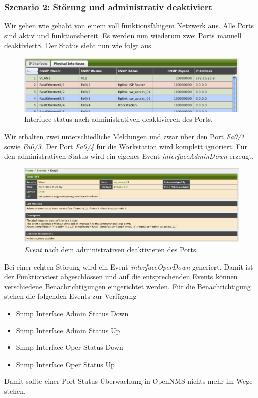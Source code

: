 \subsubsection{Szenario 2: Störung und administrativ deaktiviert}
Wir gehen wie gehabt von einem voll funktionsfähigem Netzwerk aus. Alle Ports sind aktiv und funktionsbereit. Es werden nun wiederum zwei Ports manuell deaktiviert8. Der Status sieht nun wie folgt aus.
\begin{figure}[H]
	\centering
	\includegraphics[width=1.0\textwidth]{images/use-cases/monitoring-layer-2/port-admin-down}
	\caption{Interface status nach administrativen deaktivieren des Ports.}
	\label{pic:port-admin-down}
\end{figure}
Wir erhalten zwei unterschiedliche Meldungen und zwar über den Port \emph{Fa0/1} sowie \emph{Fa0/3}. Der Port \emph{Fa0/4} für die Workstation wird komplett ignoriert. Für den administrativen Status wird ein eigenes Event \emph{interfaceAdminDown} erzeugt.
\begin{figure}[H]
	\centering
	\includegraphics[width=1.0\textwidth]{images/use-cases/monitoring-layer-2/port-admin-down-event}
	\caption{\emph{Event} nach dem administrativen deaktivieren des Ports.}
	\label{pic:port-admin-down-event}
\end{figure}
Bei einer echten Störung wird ein Event \emph{interfaceOperDown} generiert. Damit ist der Funktionstest abgeschlossen und auf die entsprechenden Events können verschiedene Benachrichtigungen eingerichtet werden. Für die Benachrichtigung stehen die folgenden Events zur Verfügung
\begin{itemize}
  \item{Snmp Interface Admin Status Down}
  \item{Snmp Interface Admin Status Up}
  \item{Snmp Interface Oper Status Down}
  \item{Snmp Interface Oper Status Up}
\end{itemize}
Damit sollte einer Port Status Überwachung in OpenNMS nichts mehr im Wege stehen. 
